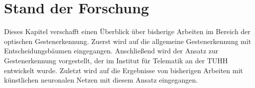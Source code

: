 \chapter{Stand der Forschung}
Dieses Kapitel verschafft einen Überblick über bisherige Arbeiten im Bereich der optischen Gestenerkennung. Zuerst wird auf die allgemeine Gestenerkennung mit Entscheidungsbäumen eingegangen. Anschließend wird der Ansatz
zur Gestenerkennung vorgestellt, der im Institut für Telematik an der TUHH entwickelt wurde. Zuletzt wird auf die Ergebnisse von bisherigen Arbeiten mit künstlichen neuronalen Netzen mit diesem Ansatz eingegangen.



